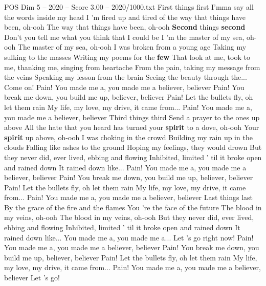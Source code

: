 \begin{textsample}{POS Dim 5 – 2020 – Score 3.00 – 2020/1000.txt}  \label{ex:f5_pos_021}
First things first I'mma say all the words inside my head I 'm fired up and tired of the way that things have been, oh-ooh The way that things have been, oh-ooh \textbf{Second} things \textbf{second} Don't you tell me what you think that I could be I 'm the master of my sea, oh-ooh The master of my sea, oh-ooh I was broken from a young age Taking my sulking to the masses Writing my poems for the \textbf{few} That look at me, took to me, thanking me, singing from heartache From the pain, taking my message from the veins Speaking my lesson from the brain Seeing the beauty through the...
Come on!
Pain!
You made me a, you made me a believer, believer Pain!
You break me down, you build me up, believer, believer Pain!
Let the bullets fly, oh let them rain My life, my love, my drive, it came from...
Pain!
You made me a, you made me a believer, believer Third things third Send a prayer to the ones up above All the hate that you heard has turned your \textbf{spirit} to a dove, oh-ooh Your \textbf{spirit} up above, oh-ooh I was choking in the crowd Building my rain up in the clouds Falling like ashes to the ground Hoping my feelings, they would drown But they never did, ever lived, ebbing and flowing Inhibited, limited ' til it broke open and rained down It rained down like...
Pain!
You made me a, you made me a believer, believer Pain!
You break me down, you build me up, believer, believer Pain!
Let the bullets fly, oh let them rain My life, my love, my drive, it came from...
Pain!
You made me a, you made me a believer, believer Last things last By the grace of the fire and the flames You 're the face of the future The blood in my veins, oh-ooh The blood in my veins, oh-ooh But they never did, ever lived, ebbing and flowing Inhibited, limited ' til it broke open and rained down It rained down like...
You made me a, you made me a...
Let 's go right now!
Pain!
You made me a, you made me a believer, believer Pain!
You break me down, you build me up, believer, believer Pain!
Let the bullets fly, oh let them rain My life, my love, my drive, it came from...
Pain!
You made me a, you made me a believer, believer Let 's go!

\end{textsample}
